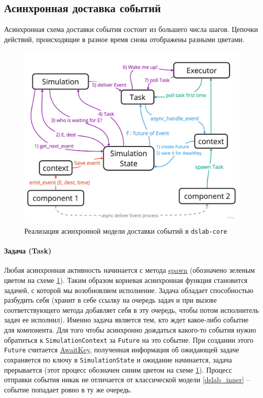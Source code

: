\subsection{Асинхронная доставка событий}
Асинхронная схема доставки события состоит из большего числа шагов. Цепочки действий, происходящие в разное время снова отображены разными цветами. 
\begin{figure}[H]
    \centering
    \includegraphics[width=\linewidth]{images/async-dslab-core-new.pdf}
    \caption{Реализация асинхронной модели доставки событий в \texttt{dslab-core}}
    \label{async_dslab_inner}
\end{figure}

\paragraph{Задача (Task)}
Любая асинхронная активность начинается с метода \hyperref[spawn]{spawn} (обозначено зеленым цветом на схеме \ref{async_dslab_inner}). Таким образом корневая асинхронная функция становится задачей, с которой мы возобновляем исполнение. Задача обладает способностью разбудить себя (хранит в себе ссылку на очередь задач и при вызове соответствующего метода добавляет себя в эту очередь, чтобы потом исполнитель задач ее исполнил). Именно задача является тем, кто ждет какое-либо событие для компонента. Для того чтобы асинхронно дождаться какого-то события нужно обратиться к \texttt{SimulationContext} за \texttt{Future} на это событие. При создании этого \texttt{Future} считается \hyperref[awaitkey]{AwaitKey}, полученная информация об ожидающей задаче сохраняется по ключу в \texttt{SimulationState} и ожидание начинается, задача прерывается (этот процесс обозначен синим цветом на схеме \ref{async_dslab_inner}). Процесс отправки события никак не отличается от классической модели \ref{dslab_inner}  -- событие попадает ровно в ту же очередь.



